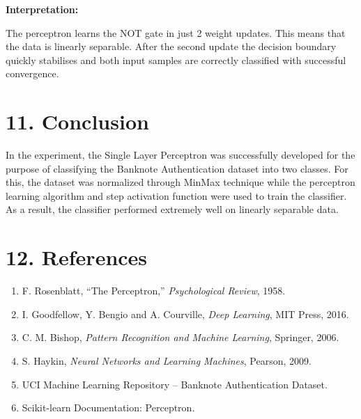 \documentclass[11pt]{article}
\begin{document}
\textbf{Interpretation:}

The perceptron learns the NOT gate in just 2 weight updates. This means that the data is linearly separable. After the second update the decision boundary quickly stabilises and both input samples are correctly classified with successful convergence.

\section*{11. Conclusion}

In the experiment, the Single Layer Perceptron was successfully developed for the purpose of classifying the Banknote Authentication dataset into two classes. For this, the dataset was normalized through MinMax technique while the perceptron learning algorithm and step activation function were used to train the classifier. As a result, the classifier performed extremely well on linearly separable data.


\section*{12. References}

\begin{enumerate}
\item F. Rosenblatt, ``The Perceptron,'' \emph{Psychological Review}, 1958.
\item I. Goodfellow, Y. Bengio and A. Courville, \emph{Deep Learning}, MIT Press, 2016.
\item C. M. Bishop, \emph{Pattern Recognition and Machine Learning}, Springer, 2006.
\item S. Haykin, \emph{Neural Networks and Learning Machines}, Pearson, 2009.
\item UCI Machine Learning Repository -- Banknote Authentication Dataset.
\item Scikit-learn Documentation: Perceptron.
\end{enumerate}
\end{document}
